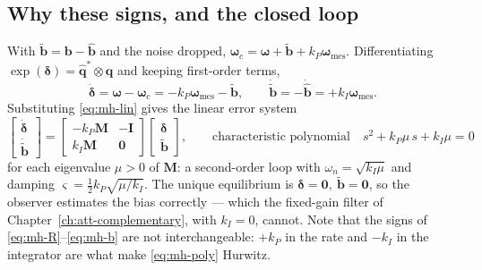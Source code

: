 \subsection{Why these signs, and the closed loop}
With $\tilde{\bm{b}}=\bm{b}-\hat{\bm{b}}$ and the noise dropped,
$\bm{\omega}_c = \bm{\omega}+\tilde{\bm{b}}+k_P\bm{\omega}_{\text{mes}}$. Differentiating
$\exp(\bm{\delta})=\hat{\bm{q}}^*\otimes\bm{q}$ and keeping first-order terms,
\begin{equation}
\dot{\bm{\delta}} = \bm{\omega}-\bm{\omega}_c = -k_P\bm{\omega}_{\text{mes}} - \tilde{\bm{b}},
\qquad
\dot{\tilde{\bm{b}}} = -\dot{\hat{\bm{b}}} = +k_I\bm{\omega}_{\text{mes}} .
\label{eq:mh-err}
\end{equation}
Substituting \eqref{eq:mh-lin} gives the linear error system
\begin{equation}
\begin{bmatrix}\dot{\bm{\delta}}\\ \dot{\tilde{\bm{b}}}\end{bmatrix}
=\begin{bmatrix}-k_P\bm{M} & -\bm{I}\\ k_I\bm{M} & \bm{0}\end{bmatrix}
\begin{bmatrix}\bm{\delta}\\ \tilde{\bm{b}}\end{bmatrix},
\qquad\text{characteristic polynomial}\quad
s^2 + k_P\mu\,s + k_I\mu = 0
\label{eq:mh-poly}
\end{equation}
for each eigenvalue $\mu>0$ of $\bm{M}$: a second-order loop with
$\omega_n=\sqrt{k_I\mu}$ and damping $\varsigma = \tfrac12 k_P\sqrt{\mu/k_I}$. The unique
equilibrium is $\bm{\delta}=\bm{0},\ \tilde{\bm{b}}=\bm{0}$, so the observer estimates the bias
correctly --- which the fixed-gain filter of Chapter~\ref{ch:att-complementary}, with
$k_I=0$, cannot. Note that the signs of \eqref{eq:mh-R}--\eqref{eq:mh-b} are not interchangeable:
$+k_P$ in the rate and $-k_I$ in the integrator are what make \eqref{eq:mh-poly} Hurwitz.

